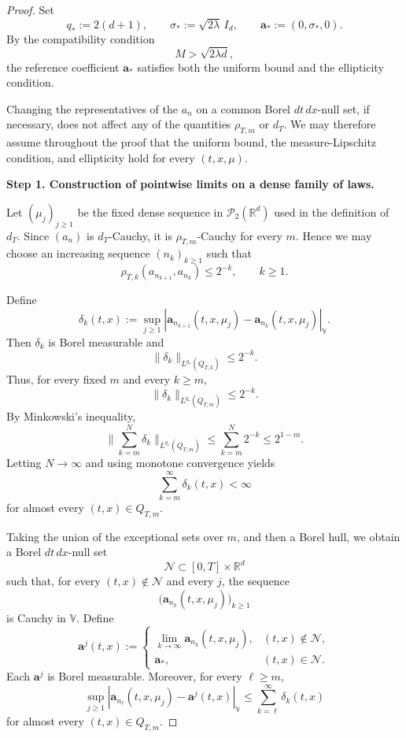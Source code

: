\documentclass[12pt,oneside, reqno]{amsart}
\numberwithin{equation}{section}
\begin{document}
	\begin{proof}
		Set
		\[
		q_\ast:=2(d+1),
		\qquad
		\sigma_\ast:=\sqrt{2\lambda}\,I_d,
		\qquad
		\mathbf a_\ast:=(0,\sigma_\ast,0).
		\]
		By the compatibility condition
		\[
		M>\sqrt{2\lambda d},
		\]
		the reference coefficient \(\mathbf a_\ast\) satisfies both the
		uniform bound and the ellipticity condition.
		
		Changing the representatives of the \(a_n\) on a common Borel
		\(dt\,dx\)-null set, if necessary, does not affect any of the
		quantities \(\rho_{T,m}\) or \(d_T\). We may therefore assume
		throughout the proof that the uniform bound, the measure-Lipschitz
		condition, and ellipticity hold for every \((t,x,\mu)\).
		
	
		\textbf{Step 1. Construction of pointwise limits on a dense family of laws.}
		
		Let \((\mu_j)_{j\geq1}\) be the fixed dense sequence in
		\(\mathcal P_2(\mathbb R^d)\) used in the definition of \(d_T\).
		Since \((a_n)\) is \(d_T\)-Cauchy, it is
		\(\rho_{T,m}\)-Cauchy for every \(m\). Hence we may choose an
		increasing sequence \((n_k)_{k\geq1}\) such that
		\begin{equation}
			\label{eq:rapid-cauchy-subsequence}
			\rho_{T,k}(a_{n_{k+1}},a_{n_k})
			\leq
			2^{-k},
			\qquad k\geq1.
		\end{equation}
		
		Define
		\[
		\delta_k(t,x)
		:=
		\sup_{j\geq1}
		\left|
		\mathbf a_{n_{k+1}}(t,x,\mu_j)
		-
		\mathbf a_{n_k}(t,x,\mu_j)
		\right|_{\mathbb V}.
		\]
		Then \(\delta_k\) is Borel measurable and
		\[
		\|\delta_k\|_{L^{q_\ast}(Q_{T,k})}
		\leq
		2^{-k}.
		\]
		Thus, for every fixed \(m\) and every \(k\geq m\),
		\[
		\|\delta_k\|_{L^{q_\ast}(Q_{T,m})}
		\leq
		2^{-k}.
		\]
		By Minkowski's inequality,
		\[
		\big\|
		\sum_{k=m}^{N}\delta_k
		\big\|_{L^{q_\ast}(Q_{T,m})}
		\leq
		\sum_{k=m}^{N}2^{-k}
		\leq
		2^{1-m}.
		\]
		Letting \(N\to\infty\) and using monotone convergence yields
		\[
		\sum_{k=m}^{\infty}\delta_k(t,x)
		<\infty
		\]
		for almost every \((t,x)\in Q_{T,m}\).
		
		Taking the union of the exceptional sets over \(m\), and then a
		Borel hull, we obtain a Borel \(dt\,dx\)-null set
		\[
		\mathcal N
		\subset
		[0,T]\times\mathbb R^d
		\]
		such that, for every \((t,x)\notin\mathcal N\) and every \(j\),
		the sequence
		\[
		\bigl(\mathbf a_{n_k}(t,x,\mu_j)\bigr)_{k\geq1}
		\]
		is Cauchy in \(\mathbb V\). Define
		\[
		\mathbf a^j(t,x)
		:=
		\begin{cases}
			\displaystyle
			\lim_{k\to\infty}
			\mathbf a_{n_k}(t,x,\mu_j),
			&(t,x)\notin\mathcal N,\\[1mm]
			\mathbf a_\ast,
			&(t,x)\in\mathcal N.
		\end{cases}
		\]
		Each \(\mathbf a^j\) is Borel measurable. Moreover, for every
		\(\ell\geq m\),
		\begin{equation}
			\label{eq:uniform-dense-tail}
			\sup_{j\geq1}
			\left|
			\mathbf a_{n_\ell}(t,x,\mu_j)
			-
			\mathbf a^j(t,x)
			\right|_{\mathbb V}
			\leq
			\sum_{k=\ell}^{\infty}\delta_k(t,x)
		\end{equation}
		for almost every \((t,x)\in Q_{T,m}\).
		

\end{proof}
\end{document}
